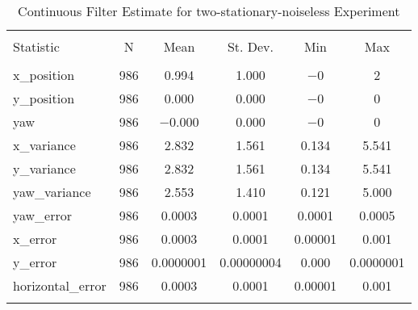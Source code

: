 
\begin{table}[h] \centering 
  \caption{Continuous Filter Estimate for two-stationary-noiseless Experiment} 
  \label{tab:two_stationary_noiseless_continuous_summary} 
\begin{tabular}{@{\extracolsep{5pt}}lccccc} 
\\[-1.8ex]\hline 
\hline \\[-1.8ex] 
Statistic & \multicolumn{1}{c}{N} & \multicolumn{1}{c}{Mean} & \multicolumn{1}{c}{St. Dev.} & \multicolumn{1}{c}{Min} & \multicolumn{1}{c}{Max} \\ 
\hline \\[-1.8ex] 
x\_position & 986 & 0.994 & 1.000 & $-$0 & 2 \\ 
y\_position & 986 & 0.000 & 0.000 & $-$0 & 0 \\ 
yaw & 986 & $-$0.000 & 0.000 & $-$0 & 0 \\ 
x\_variance & 986 & 2.832 & 1.561 & 0.134 & 5.541 \\ 
y\_variance & 986 & 2.832 & 1.561 & 0.134 & 5.541 \\ 
yaw\_variance & 986 & 2.553 & 1.410 & 0.121 & 5.000 \\ 
yaw\_error & 986 & 0.0003 & 0.0001 & 0.0001 & 0.0005 \\ 
x\_error & 986 & 0.0003 & 0.0001 & 0.00001 & 0.001 \\ 
y\_error & 986 & 0.0000001 & 0.00000004 & 0.000 & 0.0000001 \\ 
horizontal\_error & 986 & 0.0003 & 0.0001 & 0.00001 & 0.001 \\ 
\hline \\[-1.8ex] 
\end{tabular} 
\end{table} 
